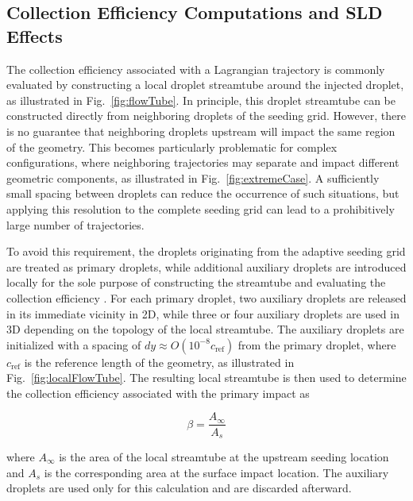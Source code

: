 \subsection{Collection Efficiency Computations and SLD Effects}
\label{sec:collectionEfficiency}

The collection efficiency associated with a Lagrangian trajectory is commonly evaluated by constructing a local droplet streamtube around the injected droplet, as illustrated in Fig.~\ref{fig:flowTube}. In principle, this droplet streamtube can be constructed directly from neighboring droplets of the seeding grid. However, there is no guarantee that neighboring droplets upstream will impact the same region of the geometry. This becomes particularly problematic for complex configurations, where neighboring trajectories may separate and impact different geometric components, as illustrated in Fig.~\ref{fig:extremeCase}. A sufficiently small spacing between droplets can reduce the occurrence of such situations, but applying this resolution to the complete seeding grid can lead to a prohibitively large number of trajectories.

To avoid this requirement, the droplets originating from the adaptive seeding grid are treated as primary droplets, while additional auxiliary droplets are introduced locally for the sole purpose of constructing the streamtube and evaluating the collection efficiency \cite{xie2020robust}. For each primary droplet, two auxiliary droplets are released in its immediate vicinity in 2D, while three or four auxiliary droplets are used in 3D depending on the topology of the local streamtube. The auxiliary droplets are initialized with a spacing of $dy \approx O(10^{-8}c_{\text{ref}})$ from the primary droplet, where $c_{\text{ref}}$ is the reference length of the geometry, as illustrated in Fig.~\ref{fig:localFlowTube}. The resulting local streamtube is then used to determine the collection efficiency associated with the primary impact as

\begin{equation}
    \beta = \frac{A_{\infty}}{A_s}
    \label{eq:lagrangianBeta}
\end{equation}

\noindent where $A_{\infty}$ is the area of the local streamtube at the upstream seeding location and $A_s$ is the corresponding area at the surface impact location. The auxiliary droplets are used only for this calculation and are discarded afterward.

